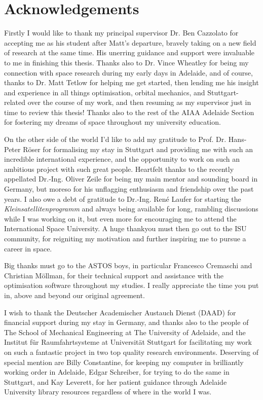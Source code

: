 \chapter*{Acknowledgements}

Firstly I would like to thank my principal supervisor Dr. Ben Cazzolato for accepting me as his student after Matt's departure, bravely taking on a new field of research at the same time. His unerring guidance and support were invaluable to me in finishing this thesis. Thanks also to Dr. Vince Wheatley for being my connection with space research during my early days in Adelaide, and of course, thanks to Dr. Matt Tetlow for helping me get started, then lending me his insight and experience in all things optimisation, orbital mechanics, and Stuttgart-related over the course of my work, and then resuming as my supervisor just in time to review this thesis! Thanks also to the rest of the AIAA Adelaide Section for fostering my dreams of space throughout my university education.

On the other side of the world I'd like to add my gratitude to Prof. Dr. Hans-Peter R\"{o}ser for formalising my stay in Stuttgart and providing me with such an incredible international experience, and the opportunity to work on such an ambitious project with such great people. Heartfelt thanks to the recently appellated Dr.-Ing. Oliver Zeile for being my main mentor and sounding board in Germany, but moreso for his unflagging enthusiasm and friendship over the past years. I also owe a debt of gratitude to Dr.-Ing. Ren\'{e} Laufer for starting the \emph{Kleinsatellitenprogramm} and always being available for long, rambling discussions while I was working on it, but even more for encouraging me to attend the International Space University. A huge thankyou must then go out to the ISU community, for reigniting my motivation and further inspiring me to pursue a career in space.

Big thanks must go to the ASTOS boys, in particular Francesco Cremaschi and Christian M\"{o}llman, for their technical support and assistance with the optimisation software throughout my studies. I really appreciate the time you put in, above and beyond our original agreement.

I wish to thank the Deutscher Academischer Austauch Dienst (DAAD) for financial support during my stay in Germany, and thanks also to the people of The School of Mechanical Engineering at The University of Adelaide, and the Institut f\"{u}r Raumfahrtsysteme at Universit\"{a}t Stuttgart for facilitating my work on such a fantastic project in two top quality research environments. Deserving of special mention are Billy Constantine, for keeping my computer in brilliantly working order in Adelaide, Edgar Schreiber, for trying to do the same in Stuttgart, and Kay Leverett, for her patient guidance through Adelaide University library resources regardless of where in the world I was.

